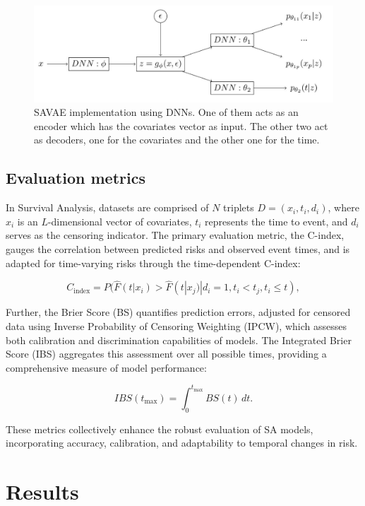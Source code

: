 \documentclass{article}
\begin{document}
\begin{figure}[H]
    \centering
    \includegraphics[width=13cm]{figures/DNN.png}
    \caption{SAVAE implementation using DNNs. One of them acts as an encoder which has the covariates vector as input. The other two act as decoders, one for the covariates and the other one for the time. }
    \label{DNN}

\end{figure}
\subsection{Evaluation metrics}
In Survival Analysis, datasets are comprised of \(N\) triplets \(D = (x_i, t_i, d_i)\), where \(x_i\) is an \(L\)-dimensional vector of covariates, \(t_i\) represents the time to event, and \(d_i\) serves as the censoring indicator. The primary evaluation metric, the C-index, gauges the correlation between predicted risks and observed event times, and is adapted for time-varying risks through the time-dependent C-index:


\begin{equation}
C_{\text{index}} = P(\hat{F}(t|x_i) > \hat{F}(t|x_j) | d_i = 1, t_i < t_j, t_i \leq t),
\end{equation}

Further, the Brier Score (BS) quantifies prediction errors, adjusted for censored data using Inverse Probability of Censoring Weighting (IPCW), which assesses both calibration and discrimination capabilities of models. The Integrated Brier Score (IBS) aggregates this assessment over all possible times, providing a comprehensive measure of model performance:


\begin{equation}
IBS(t_{\text{max}}) = \int_0^{t_{\text{max}}} BS(t) \, dt.
\end{equation}

These metrics collectively enhance the robust evaluation of SA models, incorporating accuracy, calibration, and adaptability to temporal changes in risk.

\section{Results}
\end{document}
